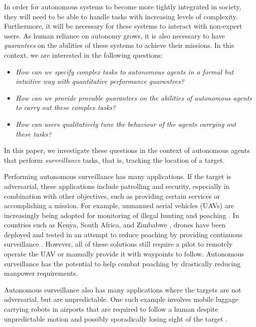 In order for autonomous systems to become more tightly integrated in society, they will need to be able to handle tasks with increasing levels of complexity. Furthermore, it will be necessary for these systems to interact with non-expert users. As human reliance on autonomy grows, it is also necessary to have \emph{guarantees} on the abilities of these systems to achieve their missions. In this context, we are interested in the following questions:
\begin{itemize}
    \item \emph{How can we specify complex tasks to autonomous agents in a formal but intuitive way with quantitative performance guarantees?}
    \item \emph{How can we provide provable guarantees on the abilities of autonomous agents to carry out these complex tasks?}
    \item \emph{How can users qualitatively tune the behaviour of the agents carrying out these tasks?}
\end{itemize}
In this paper, we investigate these questions in the context of autonomous agents that perform \emph{surveillance} tasks, that is, tracking the location of a target. 


Performing autonomous surveillance has many applications. If the target is adversarial, these applications include patrolling and security, especially in combination with other objectives, such as providing certain services or accomplishing a mission. For example, unmanned aerial vehicles (UAVs) are increasingly being adopted for monitoring of illegal hunting and poaching \cite{poaching}. In countries such as Kenya, South Africa, and Zimbabwe \cite{drones}, drones have been deployed and tested in an attempt to reduce poaching by providing continuous surveillance \cite{poaching}. However, all of these solutions still require a pilot to remotely operate the UAV or manually provide it with waypoints to follow. Autonomous surveillance has the potential to help combat poaching by drastically reducing manpower requirements. 

Autonomous surveillance also has many applications where the targets are not adversarial, but are unpredictable. One such example involves mobile luggage carrying robots in airports that are required to follow a human despite unpredictable motion and possibly sporadically losing sight of the target \cite{GonBanos02}. 

